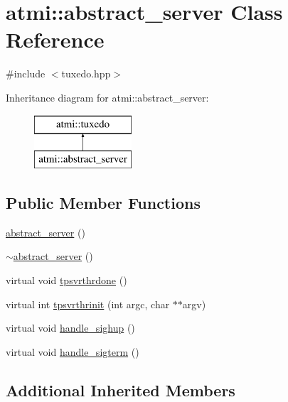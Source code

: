 \hypertarget{classatmi_1_1abstract__server}{}\section{atmi\+:\+:abstract\+\_\+server Class Reference}
\label{classatmi_1_1abstract__server}


{\ttfamily \#include $<$tuxedo.\+hpp$>$}

Inheritance diagram for atmi\+:\+:abstract\+\_\+server\+:\begin{figure}[H]
\begin{center}
\leavevmode
\includegraphics[height=2.000000cm]{classatmi_1_1abstract__server}
\end{center}
\end{figure}
\subsection*{Public Member Functions}
\begin{DoxyCompactItemize}
\item 
\hyperlink{classatmi_1_1abstract__server_ae8379cb3f00991fa5459f02d106f45de}{abstract\+\_\+server} ()
\item 
\hyperlink{classatmi_1_1abstract__server_a2a69000edc58c8111234060ea0bc330e}{$\sim$abstract\+\_\+server} ()
\item 
virtual void \hyperlink{classatmi_1_1abstract__server_ad839be63bae91afe4b5f4e090cd8e8c5}{tpsvrthrdone} ()
\item 
virtual int \hyperlink{classatmi_1_1abstract__server_a08dec6ac0346262a7364e3f6a9657016}{tpsvrthrinit} (int argc, char $\ast$$\ast$argv)
\item 
virtual void \hyperlink{classatmi_1_1abstract__server_a6ba22ce07e663a18c50e26e0bf3d1c02}{handle\+\_\+sighup} ()
\item 
virtual void \hyperlink{classatmi_1_1abstract__server_adb56df1eb235255585c3719e246bd4f3}{handle\+\_\+sigterm} ()
\end{DoxyCompactItemize}
\subsection*{Additional Inherited Members}


